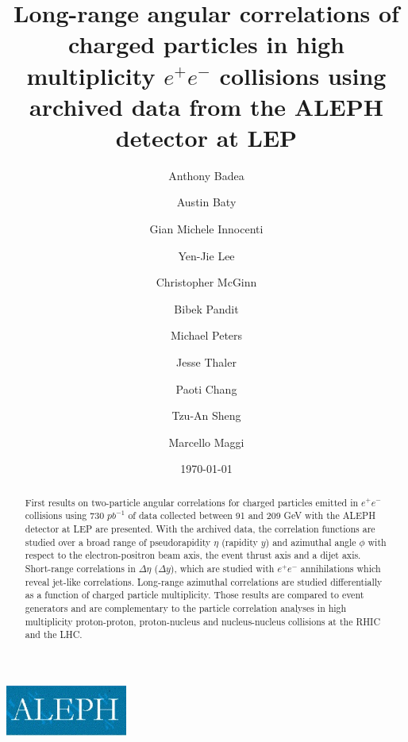 \documentclass[%
preprint,
bibnotes,
]{revtex4-1}
\begin{document}
\includegraphics[width= 40mm]{aleph-logo.jpg}
\title{Long-range angular correlations of charged particles in high multiplicity $e^+e^-$ collisions using archived data from the ALEPH detector at LEP}%

\author{Anthony Badea}%
\author{Austin Baty}%
\author{Gian Michele Innocenti}%
\author{Yen-Jie Lee}
\author{Christopher McGinn}
\author{Bibek Pandit}%
\author{Michael Peters}%
\author{Jesse Thaler}%



\author{Paoti Chang}
\author{Tzu-An Sheng}

%

\author{Marcello Maggi}

\date{\today}%

\begin{abstract}
First results on two-particle angular correlations for charged particles emitted in $e^+e^-$ collisions using 730 $pb^{-1}$ of data collected between 91 and 209 GeV with the ALEPH detector at LEP are presented. With the archived data, the correlation functions are studied over a broad range of pseudorapidity $\eta$ (rapidity $y$) and azimuthal angle $\phi$ with respect to the electron-positron beam axis, the event thrust axis and a dijet axis. Short-range correlations in $\Delta\eta$ ($\Delta y$), which are studied with $e^+e^-$ annihilations which reveal jet-like correlations. Long-range azimuthal correlations are studied differentially as a function of charged particle multiplicity. Those results are compared to event generators and are complementary to the particle correlation analyses in high multiplicity proton-proton, proton-nucleus and nucleus-nucleus collisions at the RHIC and the LHC.
\end{abstract}
\end{document}
